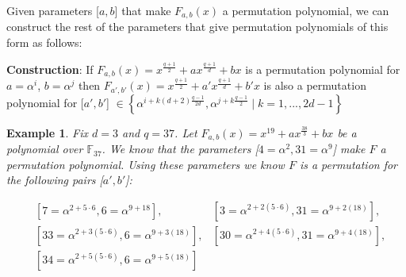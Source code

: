 \documentclass[landscape,final,paperwidth=48in,paperheight=38in]{baposter}
\newtheorem{example}{Example}
\begin{document}
\begin{poster}
{    Given parameters [$a,b$] that make $F_{a,b}(x)$ a permutation polynomial, we can construct the rest of the parameters that give permutation polynomials of this form as follows:

    \vspace{1em}
    
    {\Large \textbf{Construction}: If  $F_{a,b}(x) = x^{\frac{q+1}{2}} + a x^{\frac{q+1}{d}} + b x$ is a permutation polynomial for $a=\alpha^i$, $b=\alpha^j$ then $F_{a',b'}(x) = x^{\frac{q+1}{2}} + a' x^{\frac{q+1}{d}} + b' x$ is also a permutation polynomial for [$a',b'$] $\in \left\{ \alpha^{i+k (d+2) \frac{q-1}{2d}}, \alpha^{j+k \frac{q-1}{2}} \mid k=1,...,2d-1 \right\}$}

    \vspace{1em}

    \begin{example}
      Fix $d = 3$ and $q = 37$. Let $F_{a,b}(x) = x^{19} + a x^{\frac{38}{3}} + b x$ be a polynomial over $\mathbb{F}_{37}$. We know that the parameters [$4=\alpha^2,31=\alpha^9$] make $F$ a permutation polynomial. Using these parameters we know $F$ is a permutation for the following pairs [$a',b'$]:

      \begin{align*}
        &[7=\alpha^{2+5\cdot 6},6=\alpha^{9+18}], &[3=\alpha^{2+2(5\cdot 6)},31=\alpha^{9+2(18)}], \\
        &[33=\alpha^{2+3(5\cdot 6)},6=\alpha^{9+3(18)}], &[30=\alpha^{2+4(5\cdot 6)},31=\alpha^{9+4(18)}], \\ 
        &[34=\alpha^{2+5(5\cdot 6)},6=\alpha^{9+5(18)}]
      \end{align*}
    \end{example}

   \vspace{0.3em}
  }\label{Results}

\label{Applications}


\end{poster}
\end{document}
